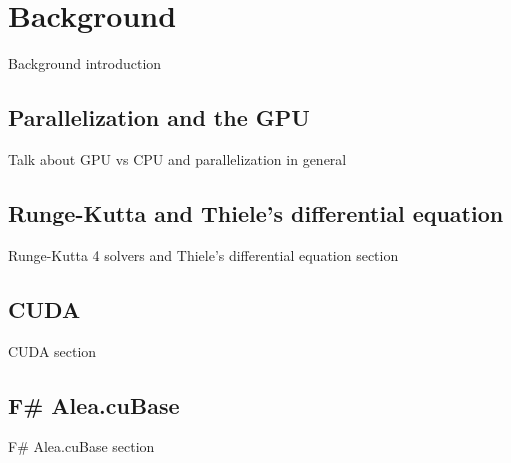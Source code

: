 \section{Background}
Background introduction
\subsection{Parallelization and the GPU}
Talk about GPU vs CPU and parallelization in general
\subsection{Runge-Kutta and Thiele's differential equation}
Runge-Kutta 4 solvers and Thiele's differential equation section\cite{actulus}
\subsection{CUDA}
CUDA section
\subsection{F\# Alea.cuBase}
F\# Alea.cuBase section